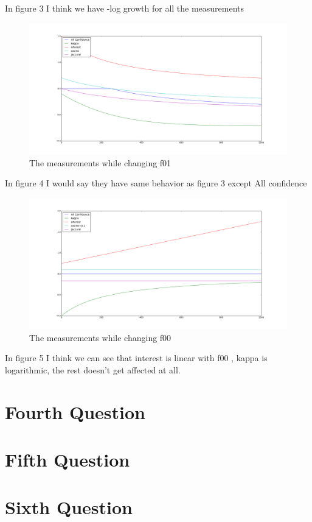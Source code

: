 \documentclass{article}
\begin{document}
In figure 3 I think we have -log growth for all the measurements 
	\begin{figure}[H]
		\includegraphics[scale=0.35]{f01.png}
		\caption{The measurements while changing f01}
	\end{figure}
	In figure 4 I would say they have same behavior as figure 3 except All confidence 
	\begin{figure}[H]
		\includegraphics[scale=0.35]{f00.png}
		\caption{The measurements while changing f00}
	\end{figure}
In figure 5 I think we can see that interest is linear with f00 , kappa is logarithmic, the rest doesn't get affected at all. 
	\section*{Fourth Question}
	\section*{Fifth Question}
	\section*{Sixth Question}
					
\end{document}

